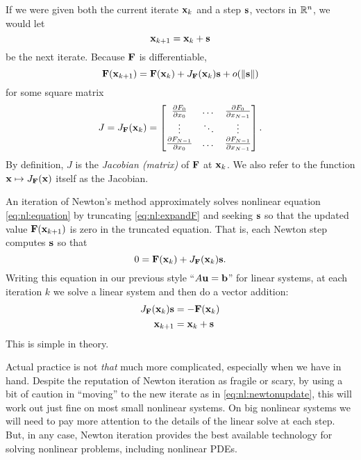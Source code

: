 If we were given both the current iterate $\mathbf{x}_k$ and a step $\mathbf{s}$, vectors in $\mathbb{R}^n$, we would let
\begin{equation}
\mathbf{x}_{k+1} = \mathbf{x}_k + \mathbf{s} \label{eq:nl:firstupdate}
\end{equation}
be the next iterate.  Because $\mathbf{F}$ is differentiable,
\begin{equation}
    \mathbf{F}(\mathbf{x}_{k+1}) = \mathbf{F}(\mathbf{x}_k) + J_{\mathbf{F}}(\mathbf{x}_k) \mathbf{s} + o(\|\mathbf{s}\|)  \label{eq:nl:expandF}
\end{equation}
for some square matrix
\begin{equation}
J = J_{\mathbf{F}}(\mathbf{x}_k) = \begin{bmatrix}
    \frac{\partial F_0}{\partial x_0} & \dots & \frac{\partial F_0}{\partial x_{N-1}} \\
    \vdots & \ddots & \vdots \\
    \frac{\partial F_{N-1}}{\partial x_0} & \dots & \frac{\partial F_{N-1}}{\partial x_{N-1}}  \end{bmatrix}.  \label{eq:nl:jacdefn}
\end{equation}
By definition, $J$ is the \emph{Jacobian (matrix)} of $\mathbf{F}$ at $\mathbf{x}_k$.  We also refer to the function $\mathbf{x} \mapsto J_{\mathbf{F}}(\mathbf{x})$ itself as the Jacobian.

An iteration of Newton's method approximately solves nonlinear equation \eqref{eq:nl:equation} by truncating \eqref{eq:nl:expandF} and seeking $\mathbf{s}$ so that the updated value $\mathbf{F}(\mathbf{x}_{k+1})$ is zero in the truncated equation.  That is, each Newton step computes $\mathbf{s}$ so that
\begin{equation}
    0 = \mathbf{F}(\mathbf{x}_k) + J_{\mathbf{F}}(\mathbf{x}_k) \mathbf{s}.
\end{equation}
Writing this equation in our previous style ``$A\mathbf{u}=\mathbf{b}$'' for linear systems, at each iteration $k$ we solve a linear system and then do a vector addition:
\begin{align}
    J_{\mathbf{F}}(\mathbf{x}_k) \mathbf{s} &= - \mathbf{F}(\mathbf{x}_k)  \label{eq:nl:newtoneq}  \\
    \mathbf{x}_{k+1} &= \mathbf{x}_k + \mathbf{s}  \label{eq:nl:newtonupdate}
\end{align}
This is simple in theory.

Actual practice is not \emph{that} much more complicated, especially when we have \PETSc in hand.  Despite the reputation of Newton iteration as fragile or scary, by using a bit of caution in ``moving'' to the new iterate as in \eqref{eq:nl:newtonupdate}, this will work out just fine on most small nonlinear systems.  On big nonlinear systems we will need to pay more attention to the details of the linear solve at each step.  But, in any case, Newton iteration provides the best available technology for solving nonlinear problems, including nonlinear PDEs.

